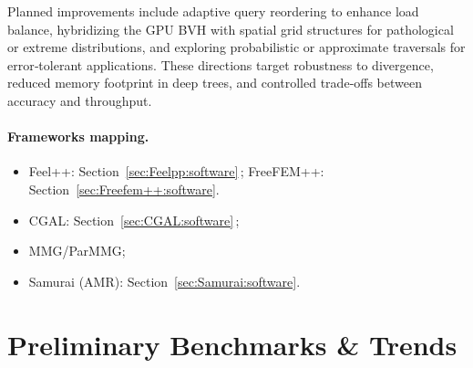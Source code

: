 Planned improvements include adaptive query reordering to enhance load balance, hybridizing the GPU BVH with spatial grid structures for pathological or extreme distributions, and exploring probabilistic or approximate traversals for error‑tolerant applications. These directions target robustness to divergence, reduced memory footprint in deep trees, and controlled trade‑offs between accuracy and throughput.



\paragraph{Frameworks mapping.}
\begin{itemize}
    \item Feel++: Section~\ref{sec:Feelpp:software}\,; FreeFEM++: Section~\ref{sec:Freefem++:software}.
    \item CGAL: Section~\ref{sec:CGAL:software}\,; 
    \item MMG/ParMMG;
    \item Samurai (AMR): Section~\ref{sec:Samurai:software}.
\end{itemize}

\section{Preliminary Benchmarks \& Trends}







